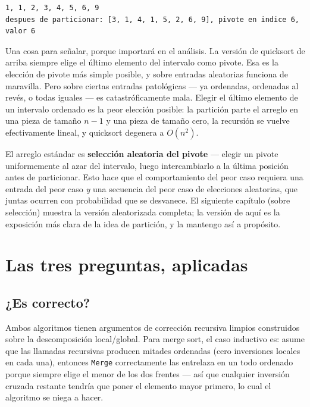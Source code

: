 \documentclass[11pt,a4paper]{article}
\begin{document}
\begin{verbatim}
1, 1, 2, 3, 4, 5, 6, 9
despues de particionar: [3, 1, 4, 1, 5, 2, 6, 9], pivote en indice 6, valor 6
\end{verbatim}

Una cosa para señalar, porque importará en el análisis. La versión de quicksort de arriba siempre elige el último elemento del intervalo como pivote. Esa es la elección de pivote más simple posible, y sobre entradas aleatorias funciona de maravilla. Pero sobre ciertas entradas patológicas --- ya ordenadas, ordenadas al revés, o todas iguales --- es catastróficamente mala. Elegir el último elemento de un intervalo ordenado es la peor elección posible: la partición parte el arreglo en una pieza de tamaño $n-1$ y una pieza de tamaño cero, la recursión se vuelve efectivamente lineal, y quicksort degenera a $O(n^2)$.

El arreglo estándar es \textbf{selección aleatoria del pivote} --- elegir un pivote uniformemente al azar del intervalo, luego intercambiarlo a la última posición antes de particionar. Esto hace que el comportamiento del peor caso requiera una entrada del peor caso \emph{y} una secuencia del peor caso de elecciones aleatorias, que juntas ocurren con probabilidad que se desvanece. El siguiente capítulo (sobre selección) muestra la versión aleatorizada completa; la versión de aquí es la exposición más clara de la idea de partición, y la mantengo así a propósito.

\section{Las tres preguntas, aplicadas}

\subsection*{¿Es correcto?}

Ambos algoritmos tienen argumentos de corrección recursiva limpios construidos sobre la descomposición local/global. Para merge sort, el caso inductivo es: asume que las llamadas recursivas producen mitades ordenadas (cero inversiones locales en cada una), entonces \texttt{Merge} correctamente las entrelaza en un todo ordenado porque siempre elige el menor de los dos frentes --- así que cualquier inversión cruzada restante tendría que poner el elemento mayor primero, lo cual el algoritmo se niega a hacer.
\end{document}
